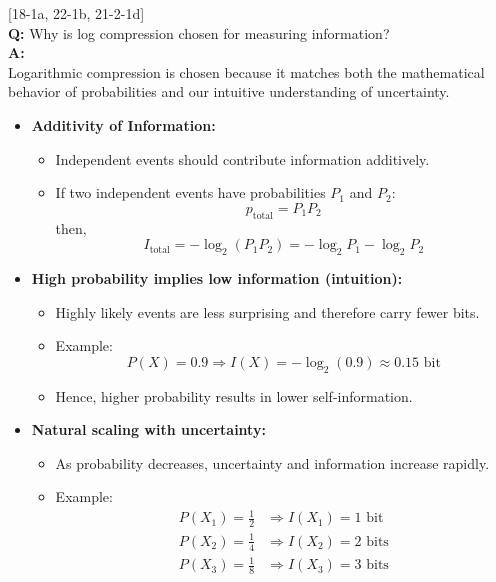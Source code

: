 \documentclass[11pt,a4paper]{book}
\newcounter{qna}[chapter]
\renewcommand{\theqna}{\thechapter.\arabic{qna}}
\newenvironment{questionanswerbox}{
    \refstepcounter{qna}%
    \begin{tcolorbox}[
        enhanced,
        breakable,
        colback=softlavender!10,
        colframe=softlavender!200,
        title={Example~\theqna}, %
        fonttitle=\bfseries,
        coltitle=white,
        colbacktitle=softlavender!200,
        sharp corners,
        boxrule=1pt,
        left=8pt,
        right=8pt,
        top=6pt,
        bottom=6pt
    ]
}{
    \end{tcolorbox}
}
\begin{document}
\begin{questionanswerbox}
[18-1a, 22-1b, 21-2-1d]\\
    \textbf{Q:} Why is log compression chosen for measuring information?\\
    \textbf{A:}\\
    Logarithmic compression is chosen because it matches both the mathematical behavior of probabilities and our intuitive understanding of uncertainty.

    \begin{itemize}
        \item \textbf{Additivity of Information:}
              \begin{itemize}
                  \item Independent events should contribute information additively.
                  \item If two independent events have probabilities \(P_1\) and \(P_2\):
                        \[
                            p_{\text{total}} = P_1 P_2
                        \]
                        then,
                        \[
                            I_{\text{total}}
                            = -\log_2(P_1P_2)
                            = -\log_2 P_1 - \log_2 P_2
                        \]
              \end{itemize}

        \item \textbf{High probability implies low information (intuition):}
      \begin{itemize}
          \item Highly likely events are less surprising and therefore carry fewer bits.
          \item Example:
                \[
                    P(X)=0.9 \Rightarrow I(X)=-\log_2(0.9)\approx 0.15 \text{ bit}
                \]
          \item Hence, higher probability results in lower self-information.
      \end{itemize}

        \item \textbf{Natural scaling with uncertainty:}
          \begin{itemize}
          \item As probability decreases, uncertainty and information increase rapidly.
          \item Example:
                \[
                    \begin{aligned}
                        P(X_1)=\frac{1}{2} & \Rightarrow I(X_1)=1 \text{ bit} \\
                        P(X_2)=\frac{1}{4} & \Rightarrow I(X_2)=2 \text{ bits} \\
                        P(X_3)=\frac{1}{8} & \Rightarrow I(X_3)=3 \text{ bits}
                    \end{aligned}
                \]
              \end{itemize}
    \end{itemize}


\end{questionanswerbox}
\end{document}
